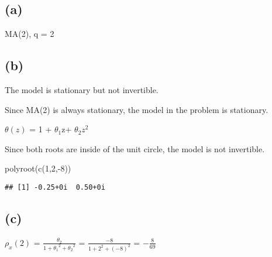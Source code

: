 \documentclass[
]{article}
\newenvironment{Shaded}{\begin{snugshade}}{\end{snugshade}}
\newcommand{\AttributeTok}[1]{\textcolor[rgb]{0.77,0.63,0.00}{#1}}
\newcommand{\DecValTok}[1]{\textcolor[rgb]{0.00,0.00,0.81}{#1}}
\newcommand{\FunctionTok}[1]{\textcolor[rgb]{0.00,0.00,0.00}{#1}}
\newcommand{\NormalTok}[1]{#1}
\newcommand{\OtherTok}[1]{\textcolor[rgb]{0.56,0.35,0.01}{#1}}
\newcommand{\SpecialCharTok}[1]{\textcolor[rgb]{0.00,0.00,0.00}{#1}}
\newcommand{\StringTok}[1]{\textcolor[rgb]{0.31,0.60,0.02}{#1}}
\begin{document}
\hypertarget{a-2}{%
\subsection{(a)}\label{a-2}}

MA(2), q = 2

\hypertarget{b-2}{%
\subsection{(b)}\label{b-2}}

The model is stationary but not invertible.

Since MA(2) is always stationary, the model in the problem is
stationary.

\(\theta(z)\) = 1 + \(\theta_1\)z+ \(\theta_2\)\(z^2\)

Since both roots are inside of the unit circle, the model is not
invertible.

\begin{Shaded}
\begin{Highlighting}[]
\FunctionTok{polyroot}\NormalTok{(}\FunctionTok{c}\NormalTok{(}\DecValTok{1}\NormalTok{,}\DecValTok{2}\NormalTok{,}\SpecialCharTok{{-}}\DecValTok{8}\NormalTok{))}
\end{Highlighting}
\end{Shaded}

\begin{verbatim}
## [1] -0.25+0i  0.50+0i
\end{verbatim}

\hypertarget{c}{%
\subsection{(c)}\label{c}}

\(\rho_x(2)\) = \(\frac{\theta_2}{1+{\theta_1}^2+{\theta_2}^2}\) =
\(\frac{-8}{1+{2}^2+{(-8)}^2}\) = \(-\frac{8}{69}\)

\begin{Shaded}
\end{Shaded}
\end{document}
